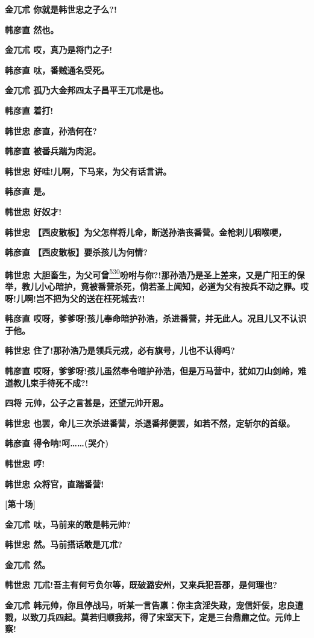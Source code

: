 \textbf{金兀朮 你就是韩世忠之子么?!}

\textbf{韩彦直 然也。}

\textbf{金兀朮 哎，真乃是将门之子!}

\textbf{韩彦直 呔，番贼通名受死。}

\textbf{金兀朮 孤乃大金邦四太子昌平王兀朮是也。}

\textbf{韩彦直 着打!}

\textbf{韩世忠 彦直，孙浩何在?}

\textbf{韩彦直 被番兵踹为肉泥。}

\textbf{韩世忠 好哇!儿啊，下马来，为父有话言讲。}

\textbf{韩彦直 是。}

\textbf{韩世忠 好奴才!}

\textbf{韩世忠
【西皮散板】为父怎样将儿命，断送孙浩丧番营。金枪刺儿咽喉哽，}

\textbf{韩彦直 【西皮散板】要杀孩儿为何情?}

\textbf{韩世忠
大胆畜生，为父可曾}\protect\hyperlink{fn530}{\textsuperscript{530}}\textbf{吩咐与你?!那孙浩乃是圣上差来，又是广阳王的保举，教儿小心暗护，竟被番营杀死，倘若圣上闻知，必道为父有按兵不动之罪。哎呀!儿啊!岂不把为父的送在枉死城去?!}

\textbf{韩彦直
哎呀，爹爹呀!孩儿奉命暗护孙浩，杀进番营，并无此人。况且儿又不认识于他。}

\textbf{韩世忠 住了!那孙浩乃是领兵元戎，必有旗号，儿也不认得吗?}

\textbf{韩彦直
哎呀，爹爹呀!孩儿虽然奉令暗护孙浩，但是万马营中，犹如刀山剑岭，难道教儿束手待死不成?!}

\textbf{四将 元帅，公子之言甚是，还望元帅开恩。}

\textbf{韩世忠
也罢，命儿三次杀进番营，杀退番邦便罢，如若不然，定斩尔的首级。}

\textbf{韩彦直 得令呐!呵\ldots{}\ldots{}(哭介)}

\textbf{韩世忠 哼!}

\textbf{韩世忠 众将官，直踹番营!}

\textbf{{[}第十场{]}}

\textbf{金兀朮 呔，马前来的敢是韩元帅?}

\textbf{韩世忠 然。马前搭话敢是兀朮?}

\textbf{金兀朮 然。}

\textbf{韩世忠
兀朮!吾主有何亏负尔等，既破潞安州，又来兵犯吾郡，是何理也?}

\textbf{金兀朮
韩元帅，你且停战马，听某一言告禀：你主贪淫失政，宠信奸佞，忠良遭戮，以致刀兵四起。莫若归顺我邦，得了宋室天下，定是三台鼎鼐之位。元帅上察!}

